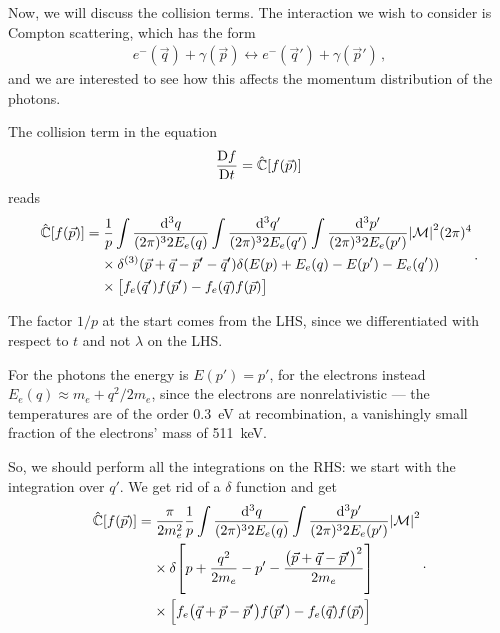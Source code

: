 \documentclass[main.tex]{subfiles}
\begin{document}

Now, we will discuss the collision terms. 
The interaction we wish to consider is Compton scattering, which has the form 
%
\begin{align}
e^{-} (\vec{q}) + \gamma (\vec{p})
\leftrightarrow
e^{-} (\vec{q}') + \gamma (\vec{p}')
\,,
\end{align}
%
and we are interested to see how this affects the momentum distribution of the photons. 

The collision term in the equation 
%
\begin{align}
\bigd{f}{t} = \hat{\mathbb{C}} [f(\vec{p})] 
\,
\end{align}
%
reads 
%
\begin{align}
\begin{split}
\hat{\mathbb{C}} [f(\vec{p})] &= \frac{1}{p} 
\int \frac{ \dd[3]{q}}{(2\pi)^3 2 E_e (q)}
\int \frac{ \dd[3]{q'}}{(2\pi)^3 2 E_e (q')}
\int \frac{ \dd[3]{p'}}{(2\pi)^3 2 E_e (p')} 
\abs{\mathcal{M}}^2 (2 \pi )^{4} \\
&\phantom{=}\ 
\times \delta^{(3)} (\vec{p} + \vec{q} - \vec{p}' - \vec{q}')
\delta (E(p) + E_e(q) - E(p') - E_e (q')) \\
&\phantom{=}\ 
\times \qty[f_e (\vec{q}') f(\vec{p}') - f_e(\vec{q}) f(\vec{p})]
\end{split}
\,.
\end{align}

The factor \(1/p\) at the start comes from the LHS, since we differentiated with respect to \(t\) and not \(\lambda \) on the LHS. 

For the photons the energy is \(E(p') = p'\), for the electrons  instead \(E_e (q) \approx m_e + q^2  /2m_e\), since the electrons are nonrelativistic --- the temperatures are of the order \SI{.3}{eV} at recombination, a vanishingly small fraction of the electrons' mass of \SI{511}{keV}. 

So, we should perform all the integrations on the RHS: we start with the integration over \(q'\). We get rid of a \(\delta \) function and get 
%
\begin{align}
\begin{split}
\hat{\mathbb{C}} [f(\vec{p})] &= \frac{\pi}{2 m_e^2}
 \frac{1}{p} 
\int \frac{ \dd[3]{q}}{(2\pi)^3 2 E_e (q)}
\int \frac{ \dd[3]{p'}}{(2\pi)^3 2 E_e (p')} 
\abs{\mathcal{M}}^2 \\
&\phantom{=}\ 
\times \delta \qty[p + \frac{q^2}{2 m_e} - p' - \frac{\qty(\vec{p}+ \vec{q} - \vec{p}')^2}{2m_e}] \\
&\phantom{=}\ 
\times \qty[f_e \qty(\vec{q} + \vec{p} - \vec{p}') f(\vec{p}')
- f_e (\vec{q}) f(\vec{p})]
\end{split}
  \,.
\end{align}
\end{document}
